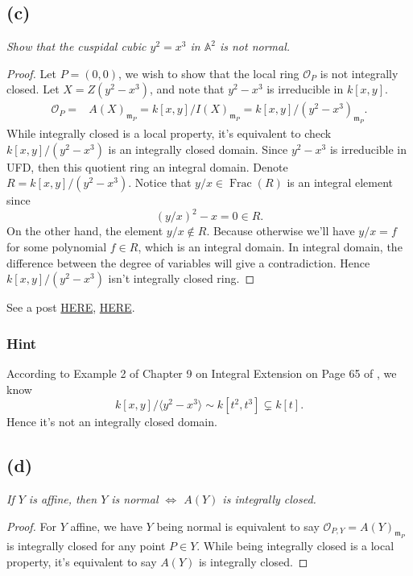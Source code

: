 \subsection{(c)}
\textit{Show that the cuspidal cubic $y^2=x^3$ in $\mathbb A^2$ is not normal.}

\begin{proof}
	Let $P=(0,0)$, we wish to show that the local ring $\mathscr O_P$ is not integrally closed. Let $X=Z(y^2-x^3)$, and note that $y^2-x^3$ is irreducible in $k[x,y]$.
	\begin{align*}
		\mathscr O_P =& A(X)_{\mathfrak m_P} = k[x,y]/I(X)_{\mathfrak m_P}=k[x,y]/(y^2-x^3)_{\mathfrak m_P}.
	\end{align*}
	While integrally closed is a local property, it's equivalent to check $k[x,y]/(y^2-x^3)$ is an integrally closed domain. Since $y^2-x^3$ is irreducible in UFD, then this quotient ring an integral domain. Denote $R=k[x,y]/(y^2-x^3)$. Notice that $y/x\in \operatorname{Frac}(R)$ is an integral element since 
	\[(y/x)^2-x=0\in R.\] On the other hand, the element $y/x\notin R$. Because otherwise we'll have $y/x=f$ for some polynomial $f\in R$, which is an integral domain. In integral domain, the difference between the degree of variables will give a contradiction. Hence $k[x,y]/(y^2-x^3)$ isn't integrally closed ring.
\end{proof}

See a post \href{https://math.stackexchange.com/questions/880433/is-mathbbcx-y-y2-x3-a-pid}{HERE}, \href{https://math.stackexchange.com/questions/2701183/the-following-domain-is-not-integrally-closed-mathbb-cx-y-langle-y2-x3}{HERE}.

\subsubsection{Hint}

According to Example 2 of Chapter 9 on Integral Extension on Page 65 of \cite{matsumura1989commutative}, we know 
\[k[x,y]/\langle y^2-x^3\rangle\sim k[t^2,t^3]\subsetneq k[t].\] Hence it's not an integrally closed domain.

\subsection{(d)}
\textit{If $Y$ is affine, then $Y$ is normal $\Leftrightarrow$ $A(Y)$ is integrally closed.}

\begin{proof}
	For $Y$ affine, we have $Y$ being normal is equivalent to say $\mathscr O_{P,Y}=A(Y)_{\mathfrak m_P}$ is integrally closed for any point $P\in Y$. While being integrally closed is a local property, it's equivalent to say $A(Y)$ is integrally closed.
\end{proof}

